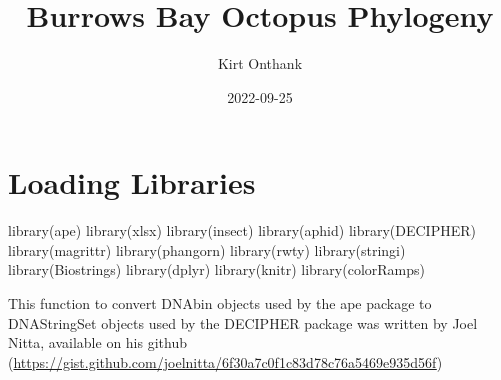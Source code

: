 \documentclass[
]{article}
\title{Burrows Bay Octopus Phylogeny}
\author{Kirt Onthank}
\date{2022-09-25}
\newenvironment{Shaded}{\begin{snugshade}}{\end{snugshade}}
\newcommand{\FunctionTok}[1]{\textcolor[rgb]{0.00,0.00,0.00}{#1}}
\newcommand{\NormalTok}[1]{#1}
\begin{document}
\maketitle

{
\setcounter{tocdepth}{3}
\tableofcontents
}
\hypertarget{loading-libraries}{%
\section{Loading Libraries}\label{loading-libraries}}

\begin{Shaded}
\begin{Highlighting}[]
\FunctionTok{library}\NormalTok{(ape)}
\FunctionTok{library}\NormalTok{(xlsx)}
\FunctionTok{library}\NormalTok{(insect)}
\FunctionTok{library}\NormalTok{(aphid)}
\FunctionTok{library}\NormalTok{(DECIPHER)}
\FunctionTok{library}\NormalTok{(magrittr)}
\FunctionTok{library}\NormalTok{(phangorn)}
\FunctionTok{library}\NormalTok{(rwty)}
\FunctionTok{library}\NormalTok{(stringi)}
\FunctionTok{library}\NormalTok{(Biostrings)}
\FunctionTok{library}\NormalTok{(dplyr)}
\FunctionTok{library}\NormalTok{(knitr)}
\FunctionTok{library}\NormalTok{(colorRamps)}
\end{Highlighting}
\end{Shaded}

This function to convert DNAbin objects used by the ape package to
DNAStringSet objects used by the DECIPHER package was written by Joel
Nitta, available on his github
(\url{https://gist.github.com/joelnitta/6f30a7c0f1c83d78c76a5469e935d56f})
\end{document}
